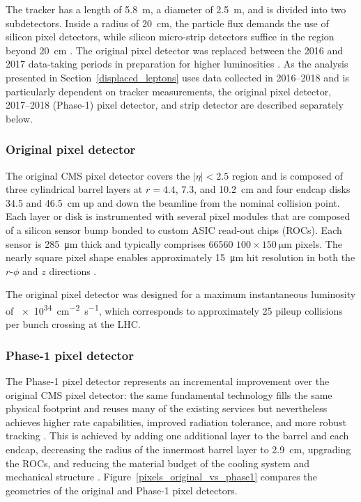 
The tracker has a length of \SI{5.8}{\m}, a diameter of \SI{2.5}{\m}, and is divided into two subdetectors. Inside a radius of \SI{20}{\cm}, the particle flux demands the use of silicon pixel detectors, while silicon micro-strip detectors suffice in the region beyond \SI{20}{\cm} \cite{cms_experiment}. The original pixel detector was replaced between the 2016 and 2017 data-taking periods in preparation for higher luminosities \cite{cms_phase1_pixels}. As the analysis presented in Section~\ref{displaced_leptons} uses data collected in 2016--2018 and is particularly dependent on tracker measurements, the original pixel detector, 2017--2018 (Phase-1) pixel detector, and strip detector are described separately below.


\subsubsection{Original pixel detector}
The original CMS pixel detector covers the $|\eta|<2.5$ region and is composed of three cylindrical barrel layers at $r=4.4$, $7.3$, and \SI{10.2}{\cm} and four endcap disks \num{34.5} and \SI{46.5}{\cm} up and down the beamline from the nominal collision point. Each layer or disk is instrumented with several pixel modules that are composed of a silicon sensor bump bonded to custom ASIC read-out chips (ROCs). Each sensor is \SI{285}{\um} thick and typically comprises \num{66560} $100\times\SI{150}{\um}$ pixels. The nearly square pixel shape enables approximately \SI{15}{\um} hit resolution in both the $r$-$\phi$ and $z$ directions \cite{cms_tdr_v1, cms_experiment}.


The original pixel detector was designed for a maximum instantaneous luminosity of \SI{e34}{\cm\tothe{-2}\s\tothe{-1}}, which corresponds to approximately 25 pileup collisions per bunch crossing at the LHC. 

\subsubsection{Phase-1 pixel detector}
The Phase-1 pixel detector represents an incremental improvement over the original CMS pixel detector: the same fundamental technology fills the same physical footprint and reuses many of the existing services but nevertheless achieves higher rate capabilities, improved radiation tolerance, and more robust tracking \cite{cms_phase1_pixels}. This is achieved by adding one additional layer to the barrel and each endcap, decreasing the radius of the innermost barrel layer to \SI{2.9}{\cm}, upgrading the ROCs, and reducing the material budget of the cooling system and mechanical structure \cite{cms_phase1_pixels, cms_phase1_pixel_tdr}. Figure~\ref{pixels_original_vs_phase1} compares the geometries of the original and Phase-1 pixel detectors.


